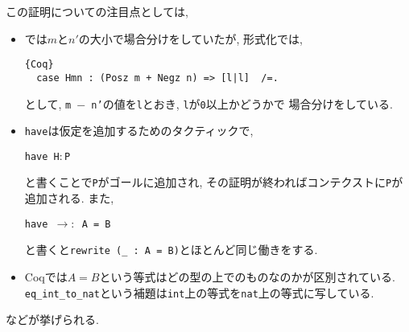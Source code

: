 \documentclass[11pt]{jsreport}
\theoremstyle{mystyle}
\newcommand{\0}{\textbf{0}}
\begin{document}
この証明についての注目点としては, 
\begin{itemize}
  \item \cite{Kac}では$m$と$n'$の大小で場合分けをしていたが, 形式化では, 
           \begin{lstlisting}{Coq}
  case Hmn : (Posz m + Negz n) => [l|l]  /=. \end{lstlisting}
           として, {\tt m $-$ n'}の値を{\tt l}とおき, {\tt l}が{\tt 0}以上かどうかで
           場合分けをしている. 
  \item {\tt have}は仮定を追加するためのタクティックで, 
  
    {\tt have H$\colon$P}
    
    と書くことで{\tt P}がゴールに追加され, その証明が終わればコンテクストに{\tt P}が追加される. 
    また, 
    
    {\tt have $\to \colon$ A = B}
    
    と書くと{\tt rewrite (\_ : A = B)}とほとんど同じ働きをする. 
  \item Coqでは$A = B$という等式はどの型の上でのものなのかが区別されている. 
           {\tt eq\_int\_to\_nat}という補題は{\tt int}上の等式を{\tt nat}上の等式に写している. 
\end{itemize}
などが挙げられる. 
\end{document}
